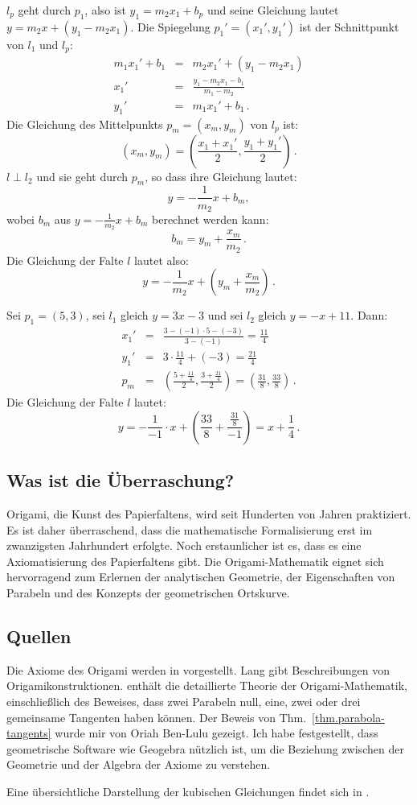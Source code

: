 $l_p$ geht durch $p_1$, also ist $y_1=m_2x_1+b_p$ und seine Gleichung lautet $y=m_2x+(y_1-m_2x_1)$. Die Spiegelung $p_1'=(x_1',y_1')$ ist der Schnittpunkt von $l_1$ und $l_p$:
\begin{eqnarray*}
m_1x_1'+b_1&=&m_2x_1'+(y_1-m_2x_1)\\
x_1'&=&\frac{y_1-m_2x_1-b_1}{m_1-m_2}\\
y_1'&=&m_1x_1'+b_1\,.
\end{eqnarray*}
Die Gleichung des Mittelpunkts $p_m=(x_m,y_m)$ von $l_p$ ist:
\[
(x_m,y_m)=\left(\frac{x_1+x_1'}{2},\frac{y_1+y_1'}{2}\right)\,.
\]
$l\perp l_2$ und sie geht durch $p_m$, so dass ihre Gleichung lautet:
\[
y=-\frac{1}{m_2}x+b_m,
\]
wobei $b_m$ aus $y=-\displaystyle\frac{1}{m_2}x+b_m$ berechnet werden kann:
\[b_m=y_m+\frac{x_m}{m_2}\,.\]
Die Gleichung der Falte $l$ lautet also:
\[
y=-\frac{1}{m_2}x+\left(y_m+\displaystyle\frac{x_m}{m_2}\right)\,.
\]
\begin{example}
Sei $p_1=(5,3)$, sei $l_1$ gleich $y=3x-3$ und sei $l_2$ gleich $y=-x+11$. Dann:
\begin{eqnarray*}
x_1'&=&\frac{3-(-1)\cdot 5-(-3)}{3-(-1)}=\frac{11}{4}\\
y_1'&=&3\cdot \frac{11}{4} + (-3)=\frac{21}{4}\\
p_m&=&\left(\frac{5+\displaystyle\frac{11}{4}}{2},\frac{3+\displaystyle\frac{21}{4}}{2}\right)=\left(\frac{31}{8},\frac{33}{8}\right)\,.
\end{eqnarray*}
Die Gleichung der Falte $l$ lautet:
\[
y=-\frac{1}{-1}\cdot x+\left(\frac{33}{8}+\frac{\displaystyle\frac{31}{8}}{-1}\right)=x+\frac{1}{4}\,.
\]
\end{example}

\subsection*{Was ist die Überraschung?}

Origami, die Kunst des Papierfaltens, wird seit Hunderten von Jahren praktiziert. Es ist daher überraschend, dass die mathematische Formalisierung erst im zwanzigsten Jahrhundert erfolgte. Noch erstaunlicher ist es, dass es eine Axiomatisierung des Papierfaltens gibt. Die Origami-Mathematik eignet sich hervorragend zum Erlernen der analytischen Geometrie, der Eigenschaften von Parabeln und des Konzepts der geometrischen Ortskurve.

\subsection*{Quellen}

Die Axiome des Origami werden in \cite{wiki:hh-axioms} vorgestellt. Lang \cite{lang} gibt Beschreibungen von Origamikonstruktionen. 
\cite[Kap.~10]{martin} enthält die detaillierte Theorie der Origami-Mathematik, einschließlich des Beweises, dass zwei Parabeln null, eine, zwei oder drei gemeinsame Tangenten haben können. Der Beweis von Thm.~\ref{thm.parabola-tangents} wurde mir von Oriah Ben-Lulu gezeigt. Ich habe festgestellt, dass geometrische Software wie Geogebra nützlich ist, um die Beziehung zwischen der Geometrie und der Algebra der Axiome zu verstehen.

Eine übersichtliche Darstellung der kubischen Gleichungen findet sich in \cite[Chapters~1,\ 2]{jorg}.
